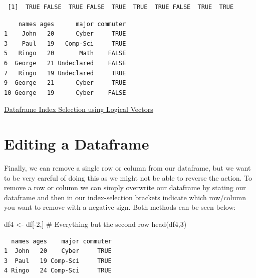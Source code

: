 \documentclass[
  letterpaper,
  DIV=11,
  numbers=noendperiod]{scrreprt}
\newenvironment{Shaded}{\begin{snugshade}}{\end{snugshade}}
\newcommand{\CommentTok}[1]{\textcolor[rgb]{0.37,0.37,0.37}{#1}}
\newcommand{\DecValTok}[1]{\textcolor[rgb]{0.68,0.00,0.00}{#1}}
\newcommand{\FunctionTok}[1]{\textcolor[rgb]{0.28,0.35,0.67}{#1}}
\newcommand{\NormalTok}[1]{\textcolor[rgb]{0.00,0.23,0.31}{#1}}
\newcommand{\OtherTok}[1]{\textcolor[rgb]{0.00,0.23,0.31}{#1}}
\newcommand{\SpecialCharTok}[1]{\textcolor[rgb]{0.37,0.37,0.37}{#1}}
\begin{document}
\begin{verbatim}
 [1]  TRUE FALSE  TRUE FALSE  TRUE  TRUE  TRUE FALSE  TRUE  TRUE
\end{verbatim}

\begin{Shaded}
\end{Shaded}

\begin{verbatim}
    names ages      major commuter
1    John   20      Cyber     TRUE
3    Paul   19   Comp-Sci     TRUE
5   Ringo   20       Math    FALSE
6  George   21 Undeclared    FALSE
7   Ringo   19 Undeclared     TRUE
9  George   21      Cyber     TRUE
10 George   19      Cyber    FALSE
\end{verbatim}

\begin{watch}{}{}
    \href{https://youtu.be/hksRGX-YT6w}{Dataframe Index Selection using Logical Vectors}
\end{watch}

\section{Editing a Dataframe}\label{editing-a-dataframe}

Finally, we can remove a single row or column from our dataframe, but we
want to be very careful of doing this as we might not be able to reverse
the action. To remove a row or column we can simply overwrite our
dataframe by stating our dataframe and then in our index-selection
brackets indicate which row/column you want to remove with a negative
sign. Both methods can be seen below:

\begin{Shaded}
\begin{Highlighting}[]
\NormalTok{df4 }\OtherTok{\textless{}{-}}\NormalTok{ df[}\SpecialCharTok{{-}}\DecValTok{2}\NormalTok{,] }\CommentTok{\# Everything but the second row}
\FunctionTok{head}\NormalTok{(df4,}\DecValTok{3}\NormalTok{)}
\end{Highlighting}
\end{Shaded}

\begin{verbatim}
  names ages    major commuter
1  John   20    Cyber     TRUE
3  Paul   19 Comp-Sci     TRUE
4 Ringo   24 Comp-Sci     TRUE
\end{verbatim}
\end{document}
